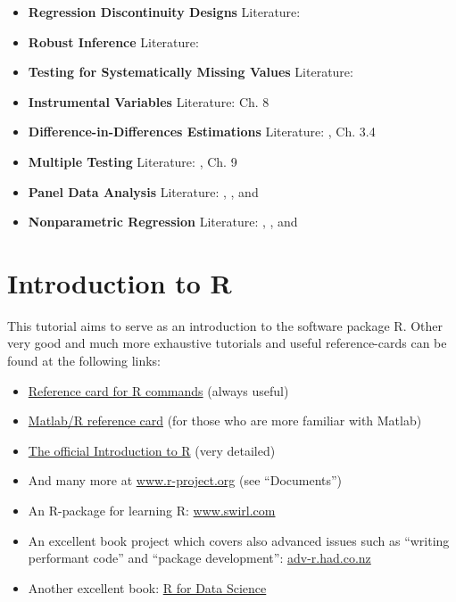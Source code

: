 \documentclass[
]{book}
\providecommand{\tightlist}{%
  \setlength{\itemsep}{0pt}\setlength{\parskip}{0pt}}
\begin{document}
\begin{itemize}
\item
  \textbf{Regression Discontinuity Designs}
  Literature: \citet{IL2008}
\item
  \textbf{Robust Inference}
  Literature: \citet{RobInf2011}
\item
  \textbf{Testing for Systematically Missing Values}
  Literature: \citet{L1988}
\item
  \textbf{Instrumental Variables}
  Literature: \citet{DMcK2004} Ch. 8
\item
  \textbf{Difference-in-Differences Estimations}
  Literature: \citet{DID_2004}, \citet{cerulli2015} Ch. 3.4
\end{itemize}

\begin{itemize}
\item
  \textbf{Multiple Testing}
  Literature: \citet{BHW2010}, \citet{Lehmann2006} Ch. 9
\item
  \textbf{Panel Data Analysis}
  Literature: \citet{H2014}, \citet{G2003}, and \citet{B2008}
\item
  \textbf{Nonparametric Regression}
  Literature: \citet{LR2007}, \citet{FG1996}, and \citet{WJ1994}
\end{itemize}

\hypertarget{introduction-to-r}{%
\chapter{Introduction to R}\label{introduction-to-r}}

This tutorial aims to serve as an introduction to the software package R. Other very good and much more exhaustive tutorials and useful reference-cards can be found at the following links:

\begin{itemize}
\tightlist
\item
  \href{http://cran.r-project.org/doc/contrib/refcard.pdf}{Reference card for R commands} (always useful)
\item
  \href{http://www.math.umaine.edu/~hiebeler/comp/matlabR.pdf}{Matlab/R reference card} (for those who are more familiar with Matlab)
\item
  \href{https://cran.r-project.org/doc/manuals/r-release/R-intro.pdf}{The official Introduction to R} (very detailed)
\item
  And many more at \href{https://www.r-project.org/other-docs.html}{www.r-project.org} (see ``Documents'')
\item
  An R-package for learning R: \href{https://swirlstats.com/}{www.swirl.com}
\item
  An excellent book project which covers also advanced issues such as ``writing performant code'' and ``package development'': \href{http://adv-r.had.co.nz/}{adv-r.had.co.nz}\\
\item
  Another excellent book: \href{https://r4ds.had.co.nz/}{R for Data Science}
\end{itemize}
\end{document}
